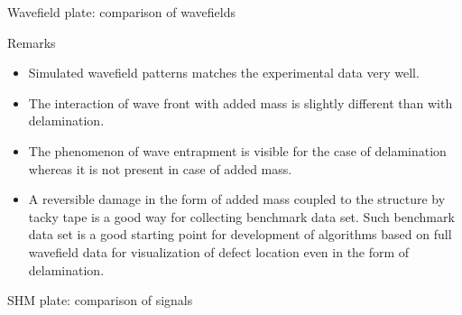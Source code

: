 \documentclass[10pt]{beamer} %
\begin{document}
\begin{frame}[t]{Wavefield plate: comparison of wavefields}
{\begin{alertblock}{Remarks}
\begin{itemize}
			\item Simulated wavefield patterns matches the experimental data very well.
			\item The interaction of wave front with added mass is slightly different than with delamination.
			\item The phenomenon of wave entrapment is visible for the case of delamination whereas it is not present in case of added mass.
			\item A reversible damage in the form of added mass coupled to the structure by tacky tape is a good way for collecting benchmark data set. Such benchmark data set is a good starting point for development of algorithms based on full wavefield data for visualization of defect location even in the form of delamination.
		\end{itemize}
	\end{alertblock}
	}
\end{frame}

\begin{frame}[t]{SHM plate: comparison of signals}
	\begin{figure}
		\centering
	\end{figure}
\end{frame}
\end{document}
